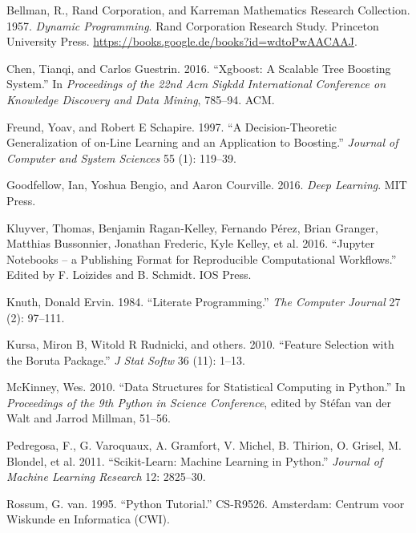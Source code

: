 \documentclass[
  11pt,
  a4paper,
  DIV=12,captions=tableheading,oneside]{scrbook}
\begin{document}
\leavevmode\hypertarget{ref-bellman1957dynamic}{}%
Bellman, R., Rand Corporation, and Karreman Mathematics Research Collection. 1957. \emph{Dynamic Programming}. Rand Corporation Research Study. Princeton University Press. \url{https://books.google.de/books?id=wdtoPwAACAAJ}.

\leavevmode\hypertarget{ref-chen2016xgboost}{}%
Chen, Tianqi, and Carlos Guestrin. 2016. ``Xgboost: A Scalable Tree Boosting System.'' In \emph{Proceedings of the 22nd Acm Sigkdd International Conference on Knowledge Discovery and Data Mining}, 785--94. ACM.

\leavevmode\hypertarget{ref-freund1997decision}{}%
Freund, Yoav, and Robert E Schapire. 1997. ``A Decision-Theoretic Generalization of on-Line Learning and an Application to Boosting.'' \emph{Journal of Computer and System Sciences} 55 (1): 119--39.

\leavevmode\hypertarget{ref-Goodfellow-et-al-2016}{}%
Goodfellow, Ian, Yoshua Bengio, and Aaron Courville. 2016. \emph{Deep Learning}. MIT Press.

\leavevmode\hypertarget{ref-Kluyver:2016aa}{}%
Kluyver, Thomas, Benjamin Ragan-Kelley, Fernando Pérez, Brian Granger, Matthias Bussonnier, Jonathan Frederic, Kyle Kelley, et al. 2016. ``Jupyter Notebooks -- a Publishing Format for Reproducible Computational Workflows.'' Edited by F. Loizides and B. Schmidt. IOS Press.

\leavevmode\hypertarget{ref-knuth1984literate}{}%
Knuth, Donald Ervin. 1984. ``Literate Programming.'' \emph{The Computer Journal} 27 (2): 97--111.

\leavevmode\hypertarget{ref-kursa2010boruta}{}%
Kursa, Miron B, Witold R Rudnicki, and others. 2010. ``Feature Selection with the Boruta Package.'' \emph{J Stat Softw} 36 (11): 1--13.

\leavevmode\hypertarget{ref-mckinney-proc-scipy-2010}{}%
McKinney, Wes. 2010. ``Data Structures for Statistical Computing in Python.'' In \emph{Proceedings of the 9th Python in Science Conference}, edited by Stéfan van der Walt and Jarrod Millman, 51--56.

\leavevmode\hypertarget{ref-scikit-learn}{}%
Pedregosa, F., G. Varoquaux, A. Gramfort, V. Michel, B. Thirion, O. Grisel, M. Blondel, et al. 2011. ``Scikit-Learn: Machine Learning in Python.'' \emph{Journal of Machine Learning Research} 12: 2825--30.

\leavevmode\hypertarget{ref-CS-R9526}{}%
Rossum, G. van. 1995. ``Python Tutorial.'' CS-R9526. Amsterdam: Centrum voor Wiskunde en Informatica (CWI).
\end{document}
